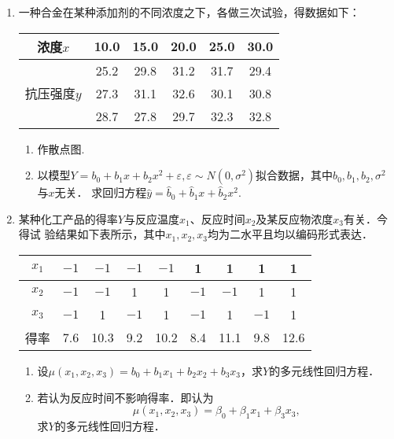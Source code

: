 \documentclass[10pt,a4paper]{article}
\begin{document}
\begin{enumerate}
    \item 一种合金在某种添加剂的不同浓度之下，各做三次试验，得数据如下：   
    \renewcommand{\arraystretch}{1.3}
    \begin{table}[H]\centering
        \begin{tabular}{c|ccccc}
        \hline
        浓度$x$                    & 10.0 & 15.0 & 20.0 & 25.0 & 30.0 \\ \hline
        \multirow{3}{*}{抗压强度$y$} & 25.2 & 29.8 & 31.2 & 31.7 & 29.4 \\ \cline{2-6} 
                                 & 27.3 & 31.1 & 32.6 & 30.1 & 30.8 \\ \cline{2-6} 
                                 & 28.7 & 27.8 & 29.7 & 32.3 & 32.8 \\ \hline
        \end{tabular}
    \end{table}
    \renewcommand{\arraystretch}{1.0}
    \begin{enumerate}
        \item 作散点图.
        \item 以模型$Y=b_0+b_1x+b_2x^2+\varepsilon,\varepsilon\sim N(0,\sigma^2)$拟合数据，其中$b_0,b_1,b_2,\sigma^2$与$x$无关．
        求回归方程$\hat{y}=\hat{b}_0+\hat{b}_1x+\hat{b}_2x^2$.
    \end{enumerate}







    \item 某种化工产品的得率$Y$与反应温度$x_1$、反应时间$x_2$及某反应物浓度$x_3$有关．今得试
    验结果如下表所示，其中$x_1,x_2,x_3$均为二水平且均以编码形式表达．
    \renewcommand{\arraystretch}{1.3}
    \begin{table}[H]\centering
        \begin{tabular}{c|cccccccc}
        \hline
        $x_1$ & $-1$ & $-1$ & $-1$ & $-1$ & 1    & 1    & 1    & 1    \\ \hline
        $x_2$ & $-1$ & $-1$ & 1    & 1    & $-1$ & $-1$ & 1    & 1    \\ \hline
        $x_3$ & $-1$ & 1    & $-1$ & 1    & $-1$ & 1    & $-1$ & 1    \\ \hline
        得率    & 7.6  & 10.3 & 9.2  & 10.2 & 8.4  & 11.1 & 9.8  & 12.6 \\ \hline
        \end{tabular}
    \end{table}
    \renewcommand{\arraystretch}{1.0}
    \begin{enumerate}
        \item 设$\mu(x_1,x_2,x_3)=b_0+b_1x_1+b_2x_2+b_3x_3$，求$Y$的多元线性回归方程．
        \item 若认为反应时间不影响得率．即认为
        $$\mu(x_1,x_2,x_3)=\beta_0+\beta_1x_1+\beta_3x_3,$$
        求$Y$的多元线性回归方程．
    \end{enumerate}


    









  

\end{enumerate}
\end{document}
